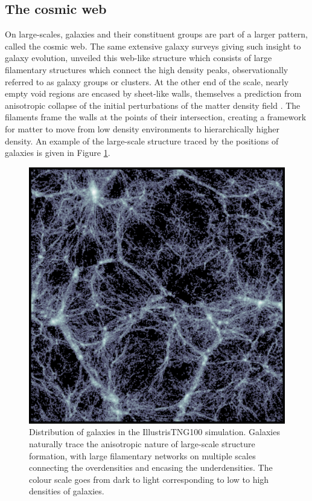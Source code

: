 \subsection{The cosmic web} \label{sec:cosmic_web_intro}
On large-scales, galaxies and their constituent groups are part of a larger pattern, called the cosmic web. The same extensive galaxy surveys giving such insight to galaxy evolution, unveiled this web-like structure \citep[e.g.][]{delapparent1986, colless2001, tegmark2004} which consists of large filamentary structures which connect the high density peaks, observationally referred to as galaxy groups or clusters. At the other end of the scale, nearly empty void regions are encased by sheet-like walls, themselves a prediction from anisotropic collapse of the initial perturbations of the matter density field \citep{zeldovich1970, shandarin1989}. The filaments frame the walls at the points of their intersection, creating a framework for matter to move from low density environments to hierarchically higher density. An example of the large-scale structure traced by the positions of galaxies is given in Figure \ref{fig:cosmo_web_tng}.

\begin{figure}
	\includegraphics[width=\linewidth]{thesis/latex/introduction/slice_image_bone.pdf}
    \caption{Distribution of galaxies in the IllustrisTNG100 simulation. Galaxies naturally trace the anisotropic nature of large-scale structure formation, with large filamentary networks on multiple scales connecting the overdensities and encasing the underdensities. The colour scale goes from dark to light corresponding to low to high densities of galaxies.}
    \label{fig:cosmo_web_tng}
\end{figure}

